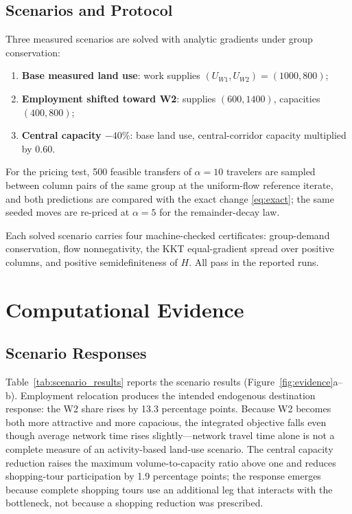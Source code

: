 \documentclass[10pt]{article}
\begin{document}
\subsection{Scenarios and Protocol}
Three measured scenarios are solved with analytic gradients under group conservation:
\begin{enumerate}
\item \textbf{Base measured land use}: work supplies $(U_{W1},U_{W2})=(1000,800)$;
\item \textbf{Employment shifted toward W2}: supplies $(600,1400)$, capacities $(400,800)$;
\item \textbf{Central capacity $-40\%$}: base land use, central-corridor capacity multiplied by 0.60.
\end{enumerate}
For the pricing test, 500 feasible transfers of $\alpha=10$ travelers are sampled between column pairs of the same group at the uniform-flow reference iterate, and both predictions are compared with the exact change \eqref{eq:exact}; the same seeded moves are re-priced at $\alpha=5$ for the remainder-decay law.

Each solved scenario carries four machine-checked certificates: group-demand conservation, flow nonnegativity, the KKT equal-gradient spread over positive columns, and positive semidefiniteness of $H$. All pass in the reported runs.

\section{Computational Evidence}

\subsection{Scenario Responses}
Table~\ref{tab:scenario_results} reports the scenario results (Figure~\ref{fig:evidence}a--b). Employment relocation produces the intended endogenous destination response: the W2 share rises by 13.3 percentage points. Because W2 becomes both more attractive and more capacious, the integrated objective falls even though average network time rises slightly---network travel time alone is not a complete measure of an activity-based land-use scenario. The central capacity reduction raises the maximum volume-to-capacity ratio above one and reduces shopping-tour participation by 1.9 percentage points; the response emerges because complete shopping tours use an additional leg that interacts with the bottleneck, not because a shopping reduction was prescribed.
\end{document}
